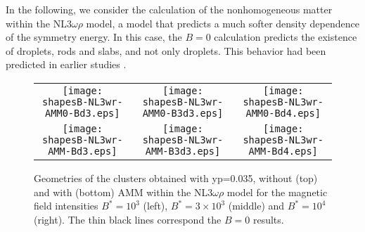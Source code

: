 \documentclass[epj]{svjour}
\begin{document}
In the following, we consider the calculation of the nonhomogeneous
matter within the NL3$\omega\rho$ model, a model that predicts a much
softer density dependence of the symmetry energy. In this case, the $B=0$
calculation predicts the existence of droplets, rods and slabs,  and
not only droplets. This behavior had
been predicted in earlier studies \cite{Oyamatsu2007}.



\begin{figure*}[htp]
  \begin{tabular}{ccc}
  \texttt{[image: shapesB-NL3wr-AMM0-Bd3.eps]} &  \texttt{[image: shapesB-NL3wr-AMM0-B3d3.eps]} &  \texttt{[image: shapesB-NL3wr-AMM0-Bd4.eps]} \\
  \texttt{[image: shapesB-NL3wr-AMM-Bd3.eps]} & \texttt{[image: shapesB-NL3wr-AMM-B3d3.eps]} & \texttt{[image: shapesB-NL3wr-AMM-Bd4.eps]} 
   \end{tabular}
\caption{Geometries of the clusters obtained with  yp=0.035, without
    (top) and with (bottom)
    AMM within the NL3$\omega\rho$ model for
    the magnetic field intensities  $B^*=10^3$ (left), $B^*=3\times 10^3$ (middle) and $B^*=10^4$ (right). The thin black lines correspond the $B=0$ results.} 
\label{fig6}
\end{figure*}
\end{document}
